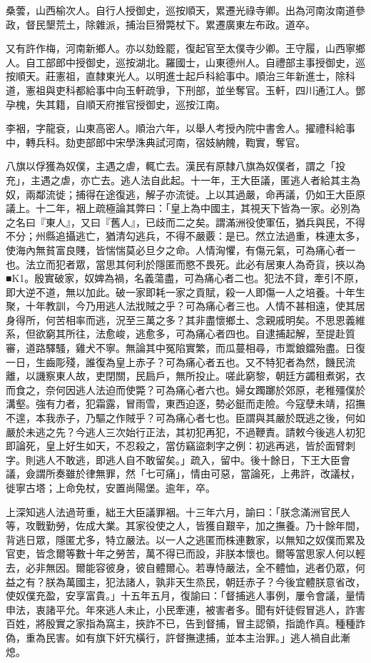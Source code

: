 \begin{pinyinscope}
桑蕓，山西榆次人。自行人授御史，巡按順天，累遷光祿寺卿。出為河南汝南道參政，督民墾荒土，除雜派，捕治巨猾斃杖下。累遷廣東左布政。道卒。

又有許作梅，河南新鄉人。亦以劾銓罷，復起官至太僕寺少卿。王守履，山西寧鄉人。自工部郎中授御史，巡按湖北。羅國士，山東德州人。自禮部主事授御史，巡按順天。莊憲祖，直隸東光人。以明進士起戶科給事中。順治三年新進士，除科道，憲祖與吏科都給事中向玉軒疏爭，下刑部，並坐奪官。玉軒，四川通江人。鄧孕槐，失其籍，自順天府推官授御史，巡按江南。

李裀，字龍袞，山東高密人。順治六年，以舉人考授內院中書舍人。擢禮科給事中，轉兵科。劾吏部郎中宋學洙典試河南，宿妓納餽，鞫實，奪官。

八旗以俘獲為奴僕，主遇之虐，輒亡去。漢民有原隸八旗為奴僕者，謂之「投充」，主遇之虐，亦亡去。逃人法自此起。十一年，王大臣議，匿逃人者給其主為奴，兩鄰流徙；捕得在途復逃，解子亦流徙。上以其過嚴，命再議，仍如王大臣原議上。十二年，裀上疏極論其弊曰：「皇上為中國主，其視天下皆為一家。必別為之名曰『東人』，又曰『舊人』，已歧而二之矣。謂滿洲役使軍伍，猶兵與民，不得不分；州縣追攝逃亡，猶清勾逃兵，不得不嚴覈：是已。然立法過重，株連太多，使海內無貧富良賤，皆惴惴莫必旦夕之命。人情洶懼，有傷元氣，可為痛心者一也。法立而犯者眾，當思其何利於隱匿而愍不畏死。此必有居東人為奇貨，挾以為■K1。殷實破家，奴婢為禍，名義蕩盡，可為痛心者二也。犯法不貸，牽引不原，即大逆不道，無以加此。破一家即耗一家之貢賦，殺一人即傷一人之培養。十年生聚，十年教訓，今乃用逃人法戕賊之乎？可為痛心者三也。人情不甚相遠，使其居身得所，何苦相率而逃，況至三萬之多？其非盡懷鄉土、念親戚明矣。不思恩義維系，但欲窮其所往，法愈峻，逃愈多，可為痛心者四也。自逮捕起解，至提赴質審，道路驛騷，雞犬不寧。無論其中冤陷實繁，而瓜蔓相尋，市鬻鋃鐺殆盡。日復一日，生齒彫殘，誰復為皇上赤子？可為痛心者五也。又不特犯者為然，饑民流離，以譏察東人故，吏閉關，民扃戶，無所投止。嗟此窮黎，朝廷方蠲租煮粥，衣而食之，奈何因逃人法迫而使斃？可為痛心者六也。婦女躅躑於郊原，老稚殭僕於溝壑。強有力者，犯霜露，冒雨雪，東西迫逐，勢必鋌而走險。今寇孽未靖，招撫不遑，本我赤子，乃驅之作賊乎？可為痛心者七也。臣謂與其嚴於既逃之後，何如嚴於未逃之先？今逃人三次始行正法，其初犯再犯，不過鞭責。請敕今後逃人初犯即論死，皇上好生如天，不忍殺之，當仿竊盜刺字之例：初逃再逃，皆於面臂刺字。則逃人不敢逃，即逃人自不敢留矣。」疏入，留中。後十餘日，下王大臣會議，僉謂所奏雖於律無罪，然「七可痛」，情由可惡，當論死，上弗許，改議杖，徙寧古塔；上命免杖，安置尚陽堡。逾年，卒。

上深知逃人法過苛重，絀王大臣議罪裀。十三年六月，諭曰：「朕念滿洲官民人等，攻戰勤勞，佐成大業。其家役使之人，皆獲自艱辛，加之撫養。乃十餘年間，背逃日眾，隱匿尤多，特立嚴法。以一人之逃匿而株連數家，以無知之奴僕而累及官吏，皆念爾等數十年之勞苦，萬不得已而設，非朕本懷也。爾等當思家人何以輕去，必非無因。爾能容彼身，彼自體爾心。若專恃嚴法，全不體恤，逃者仍眾，何益之有？朕為萬國主，犯法諸人，孰非天生烝民，朝廷赤子？今後宜體朕意省改，使奴僕充盈，安享富貴。」十五年五月，復諭曰：「督捕逃人事例，屢令會議，量情申法，衷諸平允。年來逃人未止，小民牽連，被害者多。聞有奸徒假冒逃人，詐害百姓，將殷實之家指為窩主，挾詐不已，告到督捕，冒主認領，指詭作真。種種詐偽，重為民害。如有旗下奸宄橫行，許督撫逮捕，並本主治罪。」逃人禍自此漸熄。


\end{pinyinscope}
